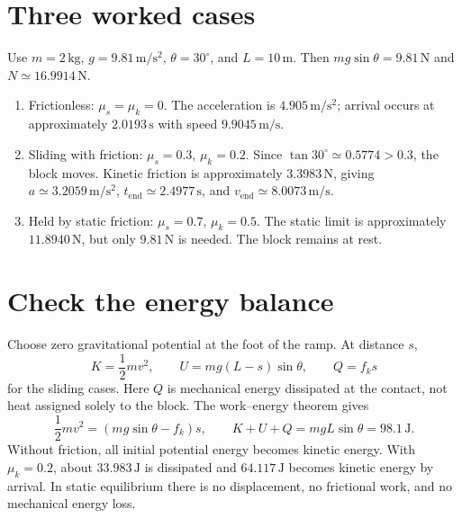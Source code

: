 \section{Three worked cases}
Use $m=2\,\mathrm{kg}$, $g=9.81\,\mathrm{m/s^2}$,
$\theta=30^\circ$, and $L=10\,\mathrm{m}$. Then
$mg\sin\theta=9.81\,\mathrm{N}$ and $N\simeq16.9914\,\mathrm{N}$.
\begin{enumerate}
\item Frictionless: $\mu_s=\mu_k=0$. The acceleration is
$4.905\,\mathrm{m/s^2}$; arrival occurs at approximately $2.0193\,\mathrm{s}$
with speed $9.9045\,\mathrm{m/s}$.
\item Sliding with friction: $\mu_s=0.3$, $\mu_k=0.2$.
Since $\tan30^\circ\simeq0.5774>0.3$, the block moves. Kinetic friction is
approximately $3.3983\,\mathrm{N}$, giving $a\simeq3.2059\,\mathrm{m/s^2}$,
$t_{\mathrm{end}}\simeq2.4977\,\mathrm{s}$, and
$v_{\mathrm{end}}\simeq8.0073\,\mathrm{m/s}$.
\item Held by static friction: $\mu_s=0.7$, $\mu_k=0.5$.
The static limit is approximately $11.8940\,\mathrm{N}$, but only
$9.81\,\mathrm{N}$ is needed. The block remains at rest.
\end{enumerate}

\section{Check the energy balance}
Choose zero gravitational potential at the foot of the ramp. At distance $s$,
\begin{equation}
K=\frac12mv^2,\qquad U=mg(L-s)\sin\theta,\qquad Q=f_k s
\end{equation}
for the sliding cases. Here $Q$ is mechanical energy dissipated at the contact,
not heat assigned solely to the block. The work--energy theorem gives
\begin{equation}
\frac12mv^2=(mg\sin\theta-f_k)s,
\qquad K+U+Q=mgL\sin\theta=98.1\,\mathrm{J}.
\end{equation}
Without friction, all initial potential energy becomes kinetic energy.
With $\mu_k=0.2$, about $33.983\,\mathrm{J}$ is dissipated and
$64.117\,\mathrm{J}$ becomes kinetic energy by arrival. In static equilibrium
there is no displacement, no frictional work, and no mechanical energy loss.

